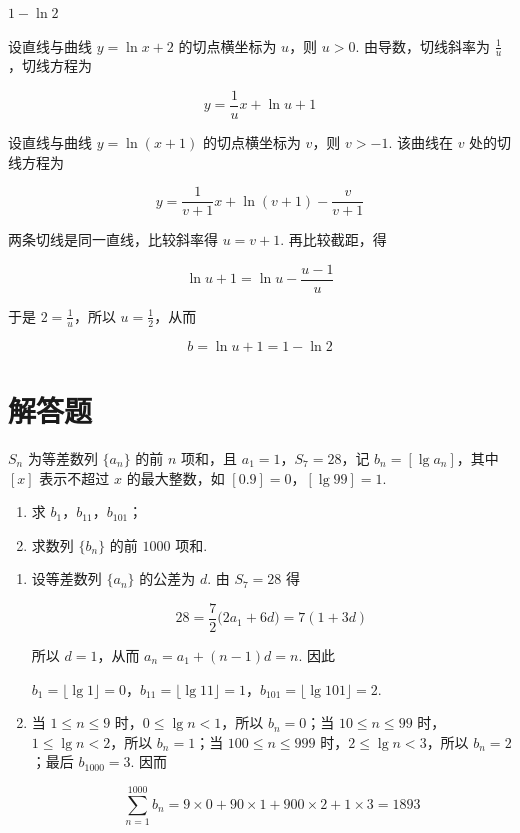 \begin{answer}
\(1-\ln2\)
\end{answer}

\begin{solution}
设直线与曲线 \(y=\ln x+2\) 的切点横坐标为 \(u\)，则 \(u>0\). 由导数，切线斜率为 \(\frac{1}{u}\)，切线方程为

\[
y=\frac1u x+\ln u+1
\]

设直线与曲线 \(y=\ln(x+1)\) 的切点横坐标为 \(v\)，则 \(v>-1\). 该曲线在 \(v\) 处的切线方程为

\[
y=\frac1{v+1}x+\ln(v+1)-\frac v{v+1}
\]

两条切线是同一直线，比较斜率得 \(u=v+1\). 再比较截距，得

\[
\ln u+1=\ln u-\frac{u-1}{u}
\]

于是 \(2=\frac{1}{u}\)，所以 \(u=\frac{1}{2}\)，从而

\[
b=\ln u+1=1-\ln2
\]
\end{solution}

\section{解答题}

\begin{problem}
\(S_n\) 为等差数列 \(\{a_n\}\) 的前 \(n\) 项和，且 \(a_1=1\)，\(S_7=28\)，记 \(b_n=[\lg a_n]\)，其中 \([x]\) 表示不超过 \(x\) 的最大整数，如 \([0.9]=0\)，\([\lg99]=1\).

\begin{enumerate}
\item 求 \(b_1\)，\(b_{11}\)，\(b_{101}\)；
\item 求数列 \(\{b_n\}\) 的前 \(1000\) 项和.
\end{enumerate}
\end{problem}

\begin{solution}
\begin{enumerate}
\item 设等差数列 \(\{a_n\}\) 的公差为 \(d\). 由 \(S_7=28\) 得

\[
28=\frac72\bigl(2a_1+6d\bigr)=7(1+3d)
\]

所以 \(d=1\)，从而 \(a_n=a_1+(n-1)d=n\). 因此

\(b_1=\lfloor\lg1\rfloor=0\)，\(b_{11}=\lfloor\lg11\rfloor=1\)，\(b_{101}=\lfloor\lg101\rfloor=2\).

\item 当 \(1\leq n\leq9\) 时，\(0\leq\lg n<1\)，所以 \(b_n=0\)；当 \(10\leq n\leq99\) 时，\(1\leq\lg n<2\)，所以 \(b_n=1\)；当 \(100\leq n\leq999\) 时，\(2\leq\lg n<3\)，所以 \(b_n=2\)；最后 \(b_{1000}=3\). 因而

\[
\sum_{n=1}^{1000}b_n=9\times0+90\times1+900\times2+1\times3=1893
\]
\end{enumerate}
\end{solution}


